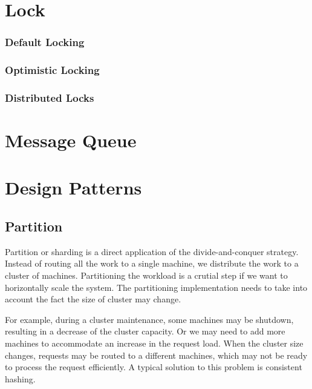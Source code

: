 \documentclass[letterpaper, oneside]{book}
\theoremstyle{definition}
\theoremstyle{remark}
\begin{document}
\chapter{Lock}

\subsection{Default Locking}

\subsection{Optimistic Locking}

\subsection{Distributed Locks}

\chapter{Message Queue}


\chapter{Design Patterns}

\section{Partition}
Partition or sharding is a direct application of the divide-and-conquer strategy. Instead of routing all the work to a single machine, we distribute the work to a cluster of machines. Partitioning the workload is a crutial step if we want to horizontally scale the system. The partitioning implementation needs to take into account the fact the size of cluster may change.

For example, during a cluster maintenance, some machines may be shutdown, resulting in a decrease of the cluster capacity. Or we may need to add more machines to accommodate an increase in the request load. When the cluster size changes, requests may be routed to a different machines, which may not be ready to process the request efficiently. A typical solution to this problem is consistent hashing.
\end{document}
